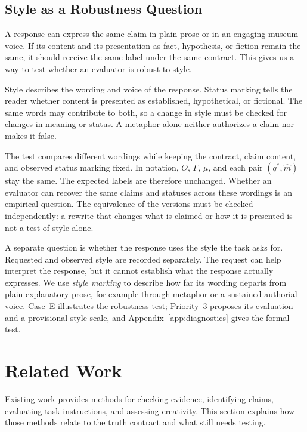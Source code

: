 \documentclass{clv2025}
\begin{document}
\subsection{Style as a Robustness Question}\label{subsec:style}

A response can express the same claim in plain prose or in an engaging
museum voice. If its content and its presentation as fact, hypothesis, or
fiction remain the same, it should receive the same label under the same
contract. This gives us a way to test whether an evaluator is robust to style.

Style describes the wording and voice of the response. Status marking tells
the reader whether content is presented as established, hypothetical, or
fictional. The same words may contribute to both, so a change in style must
be checked for changes in meaning or status. A metaphor alone neither
authorizes a claim nor makes it false.

The test compares different wordings while keeping the contract, claim
content, and observed status marking fixed. In notation, $O$, $\Gamma$,
$\mu$, and each pair $(q^*,\widehat{m})$ stay the same. The expected labels
are therefore unchanged. Whether an evaluator can recover the same claims
and statuses across these wordings is an empirical question. The equivalence
of the versions must be checked independently: a rewrite that changes what
is claimed or how it is presented is not a test of style alone.

A separate question is whether the response uses the style the task asks
for. Requested and observed style are recorded separately. The request can
help interpret the response, but it cannot establish what the response
actually expresses. We use \emph{style marking} to describe how far its
wording departs from plain explanatory prose, for example through metaphor
or a sustained authorial voice. Case~E illustrates the robustness test;
Priority~3 proposes its evaluation and a provisional style scale, and
Appendix~\ref{app:diagnostics} gives the formal test.

\section{Related Work}\label{sec:related}

Existing work provides methods for checking evidence, identifying claims,
evaluating task instructions, and assessing creativity. This section explains
how those methods relate to the truth contract and what still needs testing.
\end{document}
